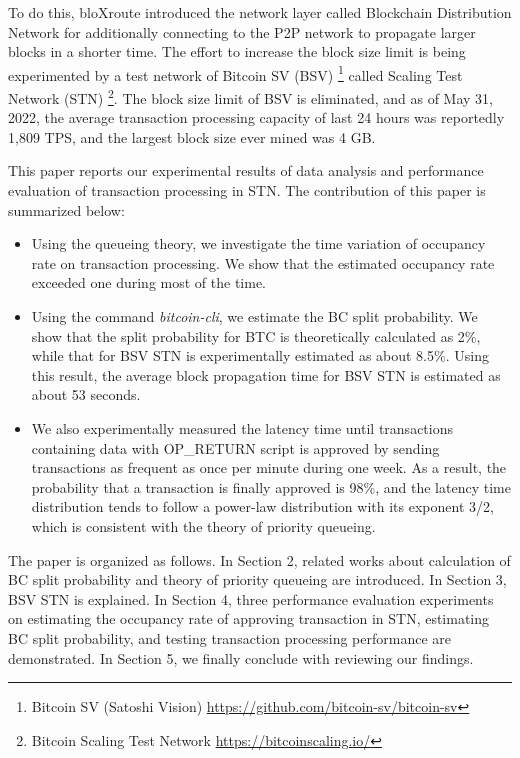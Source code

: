 \documentclass[graybox]{svmult}
\begin{document}
To do this, bloXroute\cite{bloX} introduced the network layer called Blockchain Distribution Network for additionally connecting to the P2P network to propagate larger blocks in a shorter time. 
The effort to increase the block size limit is being experimented by a test network of Bitcoin SV (BSV) \footnote{Bitcoin SV (Satoshi Vision) \url{https://github.com/bitcoin-sv/bitcoin-sv}} called Scaling Test Network (STN) \footnote{Bitcoin Scaling Test Network \url{https://bitcoinscaling.io/}}.
The block size limit of BSV is eliminated, and 
as of May 31, 2022, the average transaction processing capacity of last 24 hours was reportedly 1,809 TPS, and the largest block size ever mined was 4 GB. 


This paper reports our experimental results of data analysis and performance evaluation of transaction processing in STN. 
The contribution of this paper is summarized below: 
%
\begin{itemize}
  \item Using the queueing theory, we investigate the time variation of occupancy rate on transaction processing. 
	We show that the estimated occupancy rate exceeded one during most of the time. 
\item Using the command \textit{bitcoin-cli}, we estimate the BC split probability. 
	We show that the split probability for BTC is theoretically calculated as 2\%, while that for BSV STN is experimentally estimated as about 8.5\%.
	Using this result, the average block propagation time for BSV STN is estimated as about 53 seconds. 
  \item We also experimentally measured the latency time until transactions containing data with OP\_RETURN script is approved by sending transactions as frequent as once per minute during one week. 
	As a result, the probability that a transaction is finally approved is 98\%, and the latency time distribution tends to follow a power-law distribution with its exponent 3/2, which is consistent with the theory of priority queueing. 
\end{itemize}
%

The paper is organized as follows. In Section 2, related works about calculation of BC split probability and theory of priority queueing are introduced. In Section 3, BSV STN is explained. In Section 4, three performance evaluation experiments on estimating the occupancy rate of approving transaction in STN, estimating BC split probability, and testing transaction processing performance are demonstrated. In Section 5, we finally conclude with reviewing our findings. 
\end{document}
